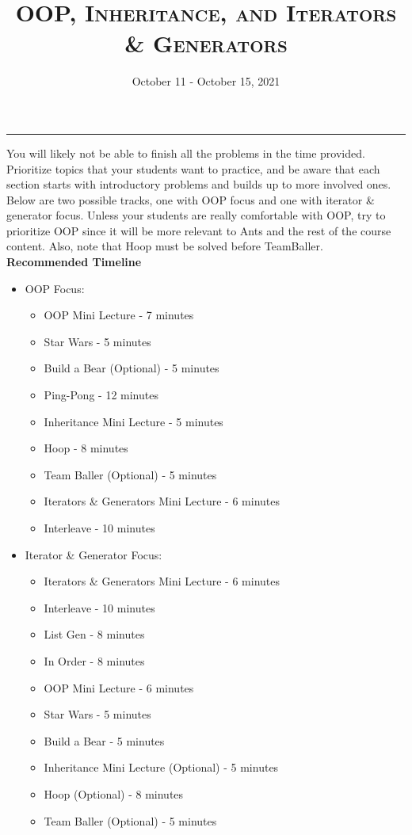 \documentclass{exam}
\title{\textsc{OOP, Inheritance, and Iterators \& Generators}}
\date{October 11 - October 15, 2021}
\begin{document}
\maketitle
\rule{\textwidth}{0.15em}
\fontsize{12}{15}\selectfont


\begin{guide}
    You will likely not be able to finish all the problems in the time provided. Prioritize topics that your students want to practice, 
    and be aware that each section starts with introductory problems and builds up to more involved ones. Below are two possible 
    tracks, one with OOP focus and one with iterator \& generator focus. Unless your students are really comfortable with OOP, 
    try to prioritize OOP since it will be more relevant to Ants and the rest of the course content. Also, note that Hoop must be 
    solved before TeamBaller.
    \newline
    \textbf{Recommended Timeline}
    \begin{itemize}
        \item OOP Focus:
        \begin{itemize}
            \item OOP Mini Lecture - 7 minutes
            \item Star Wars - 5 minutes
            \item Build a Bear (Optional) - 5 minutes
            \item Ping-Pong - 12 minutes
            \item Inheritance Mini Lecture - 5 minutes
            \item Hoop - 8 minutes
            \item Team Baller (Optional) - 5 minutes
            \item Iterators \& Generators Mini Lecture - 6 minutes
            \item Interleave - 10 minutes
        \end{itemize}
        \item Iterator \& Generator Focus:
        \begin{itemize}
            \item Iterators \& Generators Mini Lecture - 6 minutes
            \item Interleave - 10 minutes
            \item List Gen - 8 minutes
            \item In Order - 8 minutes
            \item OOP Mini Lecture - 6 minutes
            \item Star Wars - 5 minutes
            \item Build a Bear - 5 minutes
            \item Inheritance Mini Lecture (Optional) - 5 minutes
            \item Hoop (Optional) - 8 minutes
            \item Team Baller (Optional) - 5 minutes
        \end{itemize}
    \end{itemize}
\end{guide}
\end{document}
